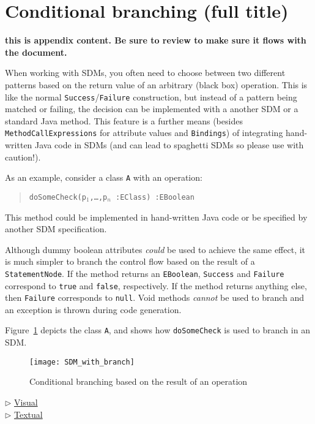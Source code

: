 \newpage
\section{Conditional branching (full title)}
\genHeader
\hypertarget{sec:conBran}{}

{\bf \large this is appendix content. Be sure to review to make sure it flows with the document.}

When working with SDMs, you often need to choose between two different patterns based on the return value of an arbitrary (black box) operation.
This is like the normal \texttt{Success}/\texttt{Failure} construction, but instead of a pattern being matched or failing, the decision can be implemented with
a another SDM or a standard Java method. This feature is a further means (besides \texttt{MethodCallExpressions} for attribute values and \texttt{Bindings}) of
integrating hand-written Java code in SDMs (and can lead to spaghetti SDMs so please use with caution!).

As an example, consider a class \texttt{A} with an operation:
\begin{quote}
 \mbox{\texttt{doSomeCheck(p$_1$,\ldots,p$_n$ :EClass) :EBoolean}}
\end{quote}

This method could be implemented in hand-written Java code or be specified by another SDM specification.

Although dummy boolean attributes \emph{could} be used to achieve the same effect, it is much simpler to branch the control flow based on the result of a \texttt{StatementNode}.
If the method returns an \texttt{EBoolean}, \texttt{Success} and \texttt{Failure} correspond to \texttt{true} and \texttt{false}, respectively. If the method returns anything else, then \texttt{Failure} corresponds to \texttt{null}. Void methods \emph{cannot} be used to branch and an exception is thrown during code generation.

Figure~\ref{fig:cond_branch_on_op} depicts the class \texttt{A}, and shows how \texttt{doSomeCheck} is used to branch in an SDM.

\begin{figure}[htp]
\begin{center}
  \texttt{[image: SDM\_with\_branch]}
  \caption{Conditional branching based on the result of an operation}
  \label{fig:cond_branch_on_op}
\end{center}
\end{figure}

\begin{center} {$\triangleright$ \hyperlink{conBran vis}{Visual}}%
\\ \vspace{0.5cm} {$\triangleright$ \hyperlink{conBran tex}{Textual} }\end{center} 



